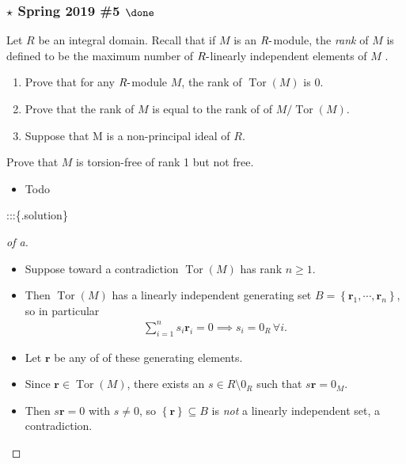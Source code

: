 \hypertarget{star-spring-2019-5-done}{%
\subsubsection{\texorpdfstring{\(\star\) Spring 2019 \#5
\(\done\)}{\textbackslash star Spring 2019 \#5 \textbackslash done}}\label{star-spring-2019-5-done}}

Let \(R\) be an integral domain. Recall that if \(M\) is an
\(R{\hbox{-}}\)module, the \emph{rank} of \(M\) is defined to be the
maximum number of \(R{\hbox{-}}\)linearly independent elements of \(M\)
.

\begin{enumerate}
\def\labelenumi{\alph{enumi}.}
\item
  Prove that for any \(R{\hbox{-}}\)module \(M\), the rank of
  \(\operatorname{Tor}(M )\) is 0.
\item
  Prove that the rank of \(M\) is equal to the rank of of
  \(M/\operatorname{Tor}(M )\).
\item
  Suppose that M is a non-principal ideal of \(R\).
\end{enumerate}

Prove that \(M\) is torsion-free of rank 1 but not free.

\begin{concept}

\envlist

\begin{itemize}
\tightlist
\item
  Todo
\end{itemize}

\end{concept}

:::\{.solution\} \envlist

\begin{proof}[of a]

\envlist

\begin{itemize}
\tightlist
\item
  Suppose toward a contradiction \(\operatorname{Tor}(M)\) has rank
  \(n \geq 1\).
\item
  Then \(\operatorname{Tor}(M)\) has a linearly independent generating
  set \(B = \left\{{\mathbf{r}_1, \cdots, \mathbf{r}_n}\right\}\), so in
  particular
  \begin{align*}  
  \sum_{i=1}^n s_i \mathbf{r}_i = 0 \implies s_i = 0_R \,\forall i
  .\end{align*}
\item
  Let \(\mathbf{r}\) be any of of these generating elements.
\item
  Since \(\mathbf{r}\in \operatorname{Tor}(M)\), there exists an
  \(s\in R\setminus 0_R\) such that \(s\mathbf{r} = 0_M\).
\item
  Then \(s\mathbf{r} = 0\) with \(s\neq 0\), so
  \(\left\{{\mathbf{r}}\right\} \subseteq B\) is \emph{not} a linearly
  independent set, a contradiction.
\end{itemize}

\end{proof}

